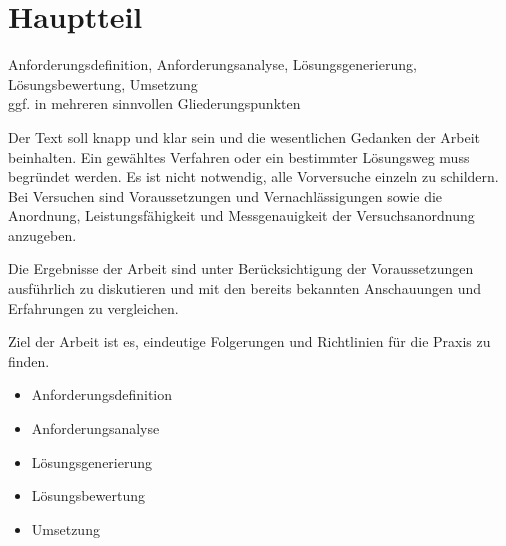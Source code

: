 \chapter{Hauptteil}
\label{cha:hauptteil}
Anforderungsdefinition, Anforderungsanalyse, Lösungsgenerierung, Lösungsbewertung, Umsetzung \\
ggf. in mehreren sinnvollen Gliederungspunkten

Der Text soll knapp und klar sein und die wesentlichen Gedanken der Arbeit beinhalten. Ein gewähltes Verfahren oder ein bestimmter Lösungsweg muss begründet werden. Es ist nicht notwendig, alle Vorversuche einzeln zu schildern. Bei Versuchen sind Voraussetzungen und Vernachlässigungen sowie die Anordnung, Leistungsfähigkeit und Messgenauigkeit der Versuchsanordnung anzugeben.

Die Ergebnisse der Arbeit sind unter Berücksichtigung der Voraussetzungen ausführlich zu diskutieren und
mit den bereits bekannten Anschauungen und Erfahrungen zu vergleichen.

Ziel der Arbeit ist es, eindeutige Folgerungen und Richtlinien für die Praxis zu finden.

\begin{itemize}
	\item Anforderungsdefinition
	\item Anforderungsanalyse
	\item Lösungsgenerierung
	\item Lösungsbewertung
	\item Umsetzung
\end{itemize}